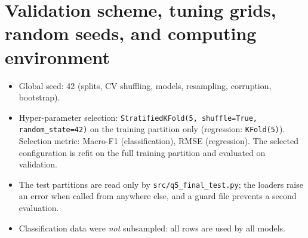 \section{Validation scheme, tuning grids, random seeds, and computing environment}
\label{sec:validation}

\begin{itemize}
  \item Global seed: 42 (splits, CV shuffling, models, resampling, corruption, bootstrap).
  \item Hyper-parameter selection: \texttt{StratifiedKFold(5, shuffle=True, random\_state=42)} on the training
        partition only (regression: \texttt{KFold(5)}). Selection metric: Macro-F1 (classification), RMSE (regression).
        The selected configuration is refit on the full training partition and evaluated on validation.
  \item The test partitions are read only by \texttt{src/q5\_final\_test.py}; the loaders raise an error when
        called from anywhere else, and a guard file prevents a second evaluation.
  \item Classification data were \emph{not} subsampled: all \NTotal{} rows are used by all models.
\end{itemize}

